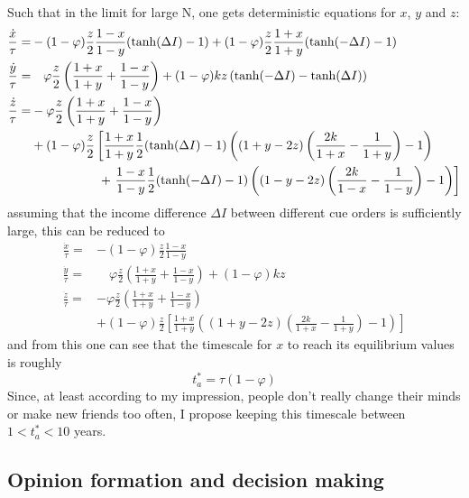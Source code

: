 Such that in the limit for large N, one gets deterministic equations for $x$, $y$ and $z$:
\begin{align}
	\frac{\dot{x}}{\tau} =& -(1-\varphi)\frac{z}{2}\frac{1-x}{1-y}(\mathrm{ tanh}(\Delta I)-1) + (1-\varphi)\frac{z}{2}\frac{1+x}{1+y}(\mathrm{ tanh}(-\Delta I)-1) \\
\frac{\dot{y}}{\tau} =& \quad \varphi\frac{z}{2}\left( \frac{1+x}{1+y} + \frac{1-x}{1-y} \right) + (1-\varphi)kz\left( \mathrm{ tanh}(-\Delta I) - \mathrm{ tanh}(\Delta I) \right) \\
	\frac{\dot{z}}{\tau} =& -\varphi\frac{z}{2}\left( \frac{1+x}{1+y} + \frac{1-x}{1-y} \right) \nonumber \\
	& + (1-\varphi)\frac{z}{2} \left[ \frac{1+x}{1+y} \frac{1}{2}(\mathrm{ tanh}(\Delta I)-1) \left( (1+y-2z)\left( \frac{2k}{1+x}-\frac{1}{1+y} \right)-1 \right) \right. \nonumber \\
	& \hspace{1.9 cm} + \left.\frac{1-x}{1-y}\frac{1}{2}(\mathrm{ tanh}(-\Delta I)-1)\left( (1-y-2z)\left( \frac{2k}{1-x}-\frac{1}{1-y} \right)-1 \right)  \right]
	\label{avm_ode}
\end{align}
assuming that the income difference $\Delta I$ between different cue orders is sufficiently large, this can be reduced to
\begin{align}
	\frac{\dot{x}}{\tau} =& -(1-\varphi)\frac{z}{2}\frac{1-x}{1-y} \\
\frac{\dot{y}}{\tau} =& \quad \varphi\frac{z}{2}\left( \frac{1+x}{1+y} + \frac{1-x}{1-y} \right) + (1-\varphi)kz \\
	\frac{\dot{z}}{\tau} =& -\varphi\frac{z}{2}\left( \frac{1+x}{1+y} + \frac{1-x}{1-y} \right) \nonumber \\
	& + (1-\varphi)\frac{z}{2} \left[ \frac{1+x}{1+y} \left( (1+y-2z)\left( \frac{2k}{1+x}-\frac{1}{1+y} \right)-1 \right) \right]
	\label{avm_ode_reduced}
\end{align}
and from this one can see that the timescale for $x$ to reach its equilibrium values is roughly 
\begin{equation}
	t_a^* = \tau(1-\varphi)
	\label{avm_timescale}
\end{equation}
Since, at least according to my impression, people don't really change their minds or make new friends too often, I propose keeping this timescale between $1<t_a^*<10$ years.
\fi
\newpage
\subsection{Opinion formation and decision making}
\label{sec:oppinion_formation_and_decision_making}

